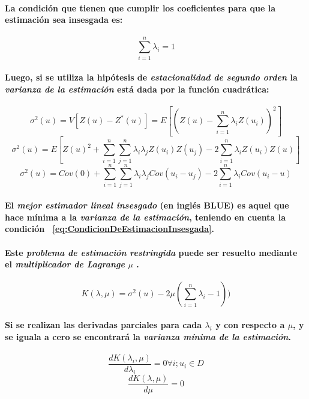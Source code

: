 \paragraph{
La condición que tienen que cumplir los coeficientes para que la estimación sea insesgada es:
}
\begin{equation}
\sum_{i=1}^n \lambda_i = 1
\label{eq:CondicionDeEstimacionInsesgada}
\end{equation}
\paragraph{
Luego, si se utiliza la hipótesis de \emph{estacionalidad de segundo orden} la \emph{varianza de la estimación} está dada por la función cuadrática:
}
\begin{equation}
\sigma^2(u) = V[Z(u)-Z^*(u)]=E[(Z(u)-\sum_{i=1}^n \lambda_i Z(u_i))^2]
\end{equation}
\begin{equation}
\sigma^2(u) = E[Z(u)^2 + \sum_{i=1}^n\sum_{j=1}^n \lambda_i\lambda_j Z(u_i)Z(u_j) - 2 \sum_{i=1}^n \lambda_i Z(u_i)Z(u)]
\end{equation}
\begin{equation}
\sigma^2(u) = Cov(0) + \sum_{i=1}^n\sum_{j=1}^n \lambda_i\lambda_j Cov(u_i - u_j) - 2 \sum_{i=1}^n \lambda_i Cov(u_i - u)
\end{equation}
\paragraph*{
El \emph{mejor estimador lineal insesgado} (en inglés BLUE\footnotemark[22]) es aquel que hace mínima a la \emph{varianza de la estimación}, teniendo en cuenta la condición ~\ref{eq:CondicionDeEstimacionInsesgada}.
}
\paragraph{
Este \emph{problema de estimación restringida} puede ser resuelto mediante el \emph{multiplicador de Lagrange} $\mu$ \cite{LAGRANGEMULTIPLIER}.
}
\begin{equation}
K(\lambda, \mu) = \sigma^2(u) - 2 \mu(\sum_{i=1}^n\lambda_i - 1))
\end{equation}
\paragraph{
Si se realizan las derivadas parciales para cada $\lambda_i$ y con respecto a $\mu$, y se iguala a cero se encontrará la \emph{varianza mínima de la estimación}.
}
\begin{equation}
\frac{dK(\lambda_i, \mu)}{d\lambda_i} = 0 \forall i; u_i \in D
\end{equation}
\begin{equation}
\frac{dK(\lambda, \mu)}{d\mu} = 0
\end{equation}
